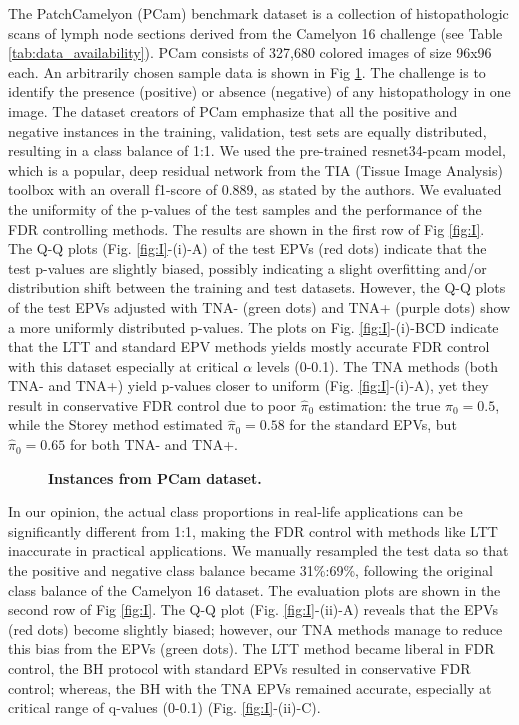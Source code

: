 \documentclass[10pt,letterpaper]{article}
\begin{document}
The PatchCamelyon (PCam) benchmark dataset is a collection of histopathologic scans of lymph node sections \cite{Veeling2018-qh} derived from the Camelyon 16 challenge \cite{camelyon16} (see Table \ref{tab:data_availability}).
PCam consists of 327,680 colored images of size 96x96 each.
An arbitrarily chosen sample data is shown in Fig \ref{fig:pcam_example}.
The challenge is to identify the presence (positive) or absence (negative) of any histopathology in one image.
The dataset creators of PCam emphasize that all the positive and negative instances in the training, validation, test sets are equally distributed, resulting in a class balance of 1:1.
We used the pre-trained resnet34-pcam model, which is a popular, deep residual network from the TIA (Tissue Image Analysis) toolbox \cite{Pocock2022} with an overall f1-score of 0.889, as stated by the authors.
We evaluated the uniformity of the p-values of the test samples and the performance of the FDR controlling methods.
The results are shown in the first row of Fig \ref{fig:I}.
The Q-Q plots (Fig. \ref{fig:I}-(i)-A) of the test EPVs (red dots) indicate that the test p-values are slightly biased, possibly indicating a slight overfitting and/or distribution shift between the training and test datasets.
However, the Q-Q plots of the test  EPVs adjusted with TNA- (green dots) and TNA+ (purple dots) show a more uniformly distributed p-values.
The plots on Fig. \ref{fig:I}-(i)-BCD indicate that the LTT and standard EPV methods yields mostly accurate FDR control with this dataset especially at critical $\alpha$ levels (0-0.1).
The TNA methods (both TNA- and TNA+) yield p-values closer to uniform (Fig. \ref{fig:I}-(i)-A), yet they result in conservative FDR control due to poor $\hat{\pi}_0$ estimation: the true $\pi_0=0.5$, while the Storey method estimated $\hat{\pi}_0=0.58$ for the standard EPVs, but $\hat{\pi}_0=0.65$ for both TNA- and TNA+.

\begin{figure}[h!]
	\centering
	\caption{{\bf Instances from PCam dataset.}}
	\label{fig:pcam_example}
\end{figure} 
 
In our opinion, the actual class proportions in real-life applications can be significantly different from 1:1, making the FDR control with methods like LTT inaccurate in practical applications.
We manually resampled the test data so that  the positive and negative class balance became 31\%:69\%, following the original class balance of the Camelyon 16 dataset.
The evaluation plots are shown in the second row of Fig \ref{fig:I}.
The Q-Q plot (Fig. \ref{fig:I}-(ii)-A) reveals that the EPVs (red dots) become slightly biased; however, our TNA methods manage to reduce this bias from the EPVs (green dots).
The LTT method became liberal in FDR control, the BH protocol with standard EPVs resulted in conservative FDR control; whereas, the BH with the TNA EPVs remained accurate, especially at critical range of q-values (0-0.1) (Fig. \ref{fig:I}-(ii)-C).
\end{document}

